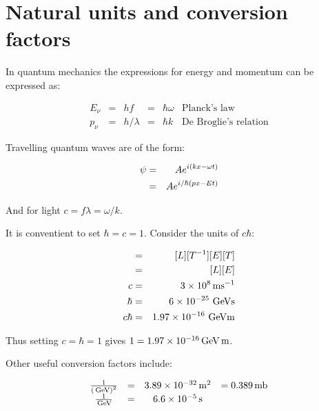 \section{Natural units and conversion factors}

In quantum mechanics the expressions for energy and momentum can be expressed as:

\[
  \begin{array}{cccccl}
  E_{\nu} & = & hf & = & \hbar \omega    & \textrm{Planck's law} \\
  p_{\nu} & = & h/\lambda & = & \hbar k & \textrm{De Broglie's relation}
  \end{array}
\]

Travelling quantum waves are of the form:

\begin{eqnarray*}
  \psi & = & A e^{i\left( kx - \omega t\right)} \\
  & = & A e^{i/\hbar\left(px - Et\right)}
\end{eqnarray*}

And for light $c = f\lambda = \omega / k$.

It is conventient to set $\hbar = c = 1$.  Consider the units of $c\hbar$:

\begin{eqnarray*}
  [c\hbar] & = & [L] [T^{-1}] [E] [T] \\
  & = & [L] [E] \\
  c & = & 3 \times 10^8 \units{ms}^{-1} \\
  \hbar & = & 6 \times 10^{-25} \units{\gev s} \\
  c \hbar & = & 1.97 \times 10^{-16} \units{\gev m}
\end{eqnarray*}

Thus setting $c = \hbar = 1$ gives $1 = 1.97 \times 10^{-16} \mathrm{\,GeV}\mathrm{\,m}$.

Other useful conversion factors include:

\[
  \begin{array}{cccl}
  \frac{1}{\left( \mathrm{\,GeV} \right)^2} & = & 3.89 \times 10^{-32}\mathrm{\,m}^2 & = 0.389 \mathrm{\,mb} \\
  \frac{1}{\mathrm{\,GeV}} & = & 6.6 \times 10^{-5} \mathrm{\,s} & 
  \end{array}
\]
